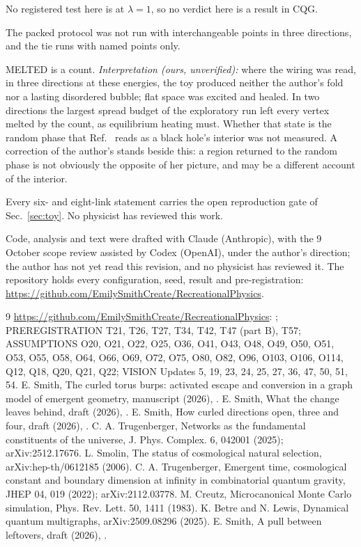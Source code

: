 \documentclass[aps,pre,10pt,twocolumn,superscriptaddress,nofootinbib]{revtex4-2}
\begin{document}
No registered test here is at $\lambda = 1$, so no verdict here is a result in CQG.

The packed protocol was not run with interchangeable points in three directions, and the tie runs with named points
only.

MELTED is a count. \emph{Interpretation (ours, unverified):} where the wiring was read, in three directions at
these energies, the toy produced neither the author's fold nor a lasting disordered bubble; flat space was excited
and healed. In two directions the largest spread budget of the exploratory run left every vertex melted by the
count, as equilibrium heating must. Whether that state is the random phase that
Ref.~\cite{T25} reads as a black hole's interior was not measured. A correction of the author's stands beside this:
a region returned to the random phase is not obviously the opposite of her picture, and may be a different account
of the interior.

Every six- and eight-link statement carries the open reproduction gate of Sec.~\ref{sec:toy}. No physicist has
reviewed this work.

\begin{acknowledgments}
Code, analysis and text were drafted with Claude (Anthropic), with the 9 October scope review assisted by Codex
(OpenAI), under the author's direction; the author has not yet read this revision, and no physicist has reviewed
it. The
repository holds every configuration, seed, result and pre-registration:
\url{https://github.com/EmilySmithCreate/RecreationalPhysics}.
\end{acknowledgments}

\begin{thebibliography}{9}
 \url{https://github.com/EmilySmithCreate/RecreationalPhysics}: ;
PREREGISTRATION T21, T26, T27, T34, T42, T47 (part B), T57; ASSUMPTIONS O20, O21, O22, O25, O36, O41, O43, O48, O49,
O50, O51, O53, O55, O58, O64, O66, O69, O72, O75, O80, O82, O96, O103, O106, O114, Q12, Q18, Q20, Q21, Q22; VISION
Updates 5, 19, 23, 24, 25, 27, 36, 47, 50, 51, 54.
 E. Smith, The curled torus burps: activated escape and conversion in a graph model of emergent
geometry, manuscript (2026), .
 E. Smith, What the change leaves behind, draft (2026), .
 E. Smith, How curled directions open, three and four, draft (2026),
.
 C. A. Trugenberger, Networks as the fundamental constituents of the universe, J. Phys. Complex. 6,
042001 (2025); arXiv:2512.17676.
 L. Smolin, The status of cosmological natural selection, arXiv:hep-th/0612185 (2006).
 C. A. Trugenberger, Emergent time, cosmological constant and boundary dimension at infinity in
combinatorial quantum gravity, JHEP 04, 019 (2022); arXiv:2112.03778.
 M. Creutz, Microcanonical Monte Carlo simulation, Phys. Rev. Lett. 50, 1411 (1983).
 K. Betre and N. Lewis, Dynamical quantum multigraphs, arXiv:2509.08296 (2025).
 E. Smith, A pull between leftovers, draft (2026), .
\end{thebibliography}
\end{document}

